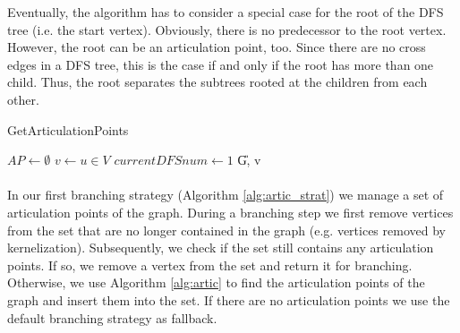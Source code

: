 \documentclass[]{article}
\begin{document}
Eventually, the algorithm has to consider a special case for the root of the DFS tree (i.e. the start vertex). Obviously, there is no predecessor to the root vertex. However, the root can be an articulation point, too. Since there are no cross edges in a DFS tree, this is the case if and only if the root has more than one child. Thus, the root separates the subtrees rooted at the children from each other.

\begin{algorithm}
	\caption{GetArticulationPoints}\label{alg:artic}
	\DontPrintSemicolon
	
	
	$AP \leftarrow \emptyset$\; 
	$v\leftarrow u\in V$
	$currentDFSnum \leftarrow 1$\;
	\U{G, v}	
	
	\;
	
\end{algorithm}

\paragraph{}
In our first branching strategy (Algorithm \ref{alg:artic_strat}) we manage a set of articulation points of the graph. During a branching step we first remove vertices from the set that are no longer contained in the graph (e.g. vertices removed by kernelization). Subsequently, we check if the set still contains any articulation points. If so, we remove a vertex from the set and return it for branching. Otherwise, we use Algorithm \ref{alg:artic} to find the articulation points of the graph and insert them into the set. If there are no articulation points we use the default branching strategy as fallback. 
\end{document}
